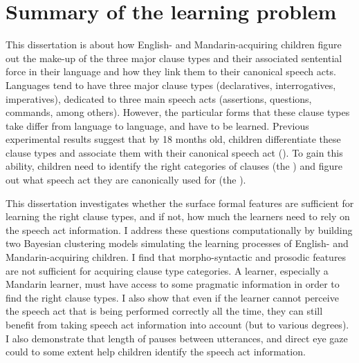\section{Summary of the learning problem}
\label{sec:intro:roadmap} 
This dissertation is about how English- and Mandarin-acquiring children figure out the make-up of the three major clause types and their associated sentential force in their language and how they link them to their canonical speech acts. Languages tend to have three major clause types (declaratives, interrogatives, imperatives), dedicated to three main speech acts (assertions, questions, commands, \cite{sz1985speechact} among others). However, the particular forms that these clause types take differ from language to language, and have to be learned. Previous experimental results suggest that by 18 months old, children differentiate these clause types and associate them with their canonical speech act (\cite{geffenmintz2011,geffenmintz2015wordorder,casillas2017turn,perkins2019,marshmallowqueen}). To gain this ability, children need to identify the right categories of clauses (the ) and figure out what speech act they are canonically used for (the ). 

This dissertation investigates whether the surface formal features are sufficient for learning the right clause types, and if not, how much the learners need to rely on the speech act information. I address these questions computationally by building two Bayesian clustering models simulating the learning processes of English- and Mandarin-acquiring children. I find that morpho-syntactic and prosodic features are not sufficient for acquiring clause type categories. A learner, especially a Mandarin learner, must have access to some pragmatic information in order to find the right clause types. I also show that even if the learner cannot perceive the speech act that is being performed correctly all the time, they can still benefit from taking speech act information into account (but to various degrees). I also demonstrate that length of pauses between utterances, and direct eye gaze could to some extent help children identify the speech act information.


